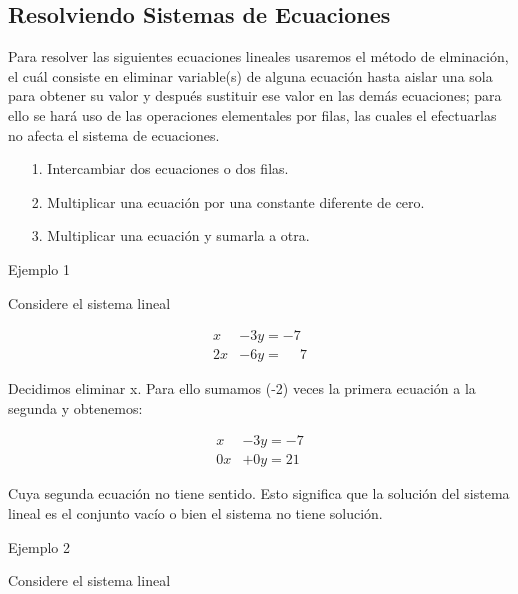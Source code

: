\documentclass{article}
\begin{document}
\subsection{Resolviendo Sistemas de Ecuaciones}

Para resolver las siguientes ecuaciones lineales usaremos el método de elminación, el cuál consiste en eliminar variable(s) de alguna ecuación hasta aislar una sola para obtener su valor y después sustituir ese valor en las demás ecuaciones; para ello se hará uso de las operaciones elementales por filas, las cuales el efectuarlas no afecta el sistema de ecuaciones. 

\begin{tcolorbox}[colback=blue!10!white,colframe=blue!60!black,title=Operaciones Elementales por filas]
    \begin{itemize}
        \item[1.] Intercambiar dos ecuaciones o dos filas.
        \item[2.] Multiplicar una ecuación por una constante diferente de cero.
        \item[3.] Multiplicar una ecuación y sumarla a otra.
    \end{itemize}
\end{tcolorbox}

\begin{large}
    Ejemplo 1
\end{large}
Considere el sistema lineal

\begin{equation*}
    \begin{aligned}
            x &- 3y = -7\\
            2x &-6y = \phantom{-} 7
    \end{aligned}
\end{equation*}

Decidimos eliminar x. Para ello sumamos (-2) veces la primera ecuación a la segunda y obtenemos:

\begin{equation*}
    \begin{aligned}
            x & - 3y = -7\\
            0x & +0y = 21
    \end{aligned}
\end{equation*}

Cuya segunda ecuación no tiene sentido. Esto significa que la solución del sistema lineal es el conjunto vacío o bien el sistema no tiene solución.

\begin{large}
    Ejemplo 2
\end{large}
Considere el sistema lineal
\end{document}
